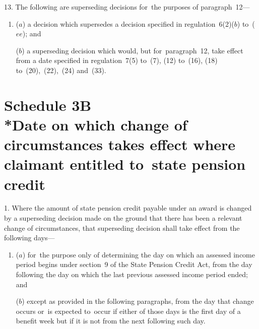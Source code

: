 \documentclass[12pt,a4paper]{article}
\begin{document}
\medskip

13.  The following are superseding decisions for~the purposes of paragraph~12—
\begin{enumerate}\item[]
($a$) a decision which supersedes a decision specified in regulation~6(2)($b$)  to~($ee$); and

($b$) a superseding decision which would, but for~paragraph~12, take effect from a date specified in regulation~7(5) to~(7), (12) to~(16), (18) to~(20),~(22),~(24) and~(33).
\end{enumerate}



\part[Schedule 3B --- Date on which change of circumstances takes effect where claimant entitled to~state pension credit]{Schedule 3B\\*Date on which change of circumstances takes effect where claimant entitled to~state pension credit}

\renewcommand\parthead{--- Schedule 3B}


\medskip

1.  Where the amount of state pension credit payable under an award is changed by a superseding decision made on the ground that there has been a relevant change of circumstances, that superseding decision shall take effect from the following days—
\begin{enumerate}\item[]
($a$) for~the purpose only of determining the day on which an assessed income period begins under section~9 of the State Pension Credit Act, from the day following the day on which the last previous assessed income period ended; and

($b$) except as provided in the following paragraphs, from the day that change occurs or~is expected to~occur if either of those days is the first day of a benefit week but if it is not from the next following such day.
\end{enumerate}
\end{document}
